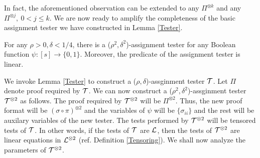 In fact, the aforementioned observation can be extended to any
$\Pi^{\otimes k}$ and any $\Pi^{\otimes j}, \ 0 < j \le k$. We are now
ready to amplify the completeness of the basic assignment tester we
have constructed in Lemma \ref{Tester}.

\begin{lemma} \label{tensortester} For any
  $\rho > 0, \delta < 1/4$, there is a ($\rho^2, \delta^2$)-assignment
  tester for any Boolean function $\psi : [s] \rightarrow
  \{0,1\}$. Moreover, the predicate of the assignment tester is
  linear.
\end{lemma}
 We invoke Lemma \ref{Tester} to construct a
($\rho, \delta$)-assginment tester ${\cal T}$.  Let $\Pi$ denote proof
required by ${\cal T}$. We can now construct a ($\rho^2,
\delta^2$)-assginment tester ${\cal T}^{\otimes 2}$ as follows. The
proof required by ${\cal T}^{\otimes 2}$ will be ${\Pi}^{\otimes
  2}$. Thus, the new proof format will be $(\sigma \circ \pi)^{\otimes
  2}$ and the variables of $\psi$ will be $\{ \sigma_{ii}\}$ and the
rest will be auxilary variables of the new tester. The tests performed
by ${\cal T}^{\otimes 2}$ will be tensored tests of ${\cal T}$. In
other words, if the tests of ${\cal T}$ are ${\cal L}$, then the tests of
${\cal T}^{\otimes 2}$ are linear equations in ${\cal L}^{\otimes 2}$
(ref. Definition \ref{Tensoring}). We shall now analyze the parameters
of ${\cal T}^{\otimes 2}$.
